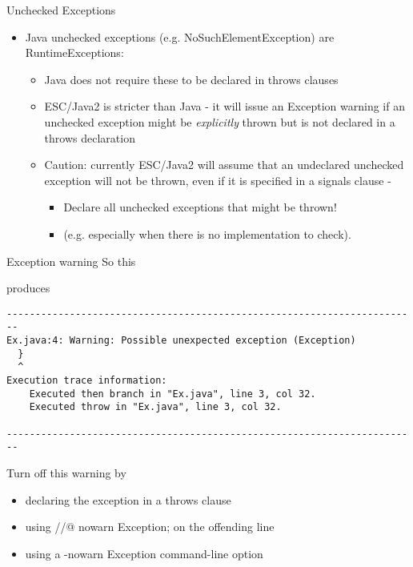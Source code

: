 \documentclass[
pdf,
nocolorBG,
slideColor,
cok,
]{prosper}
\begin{document}
\begin{slide}{Unchecked Exceptions}

\vspace*{-6ex}
\begin{itemize}
\item Java {\knalblue unchecked} exceptions (e.g. NoSuchElementException) are RuntimeExceptions:
\begin{itemize}
\item Java does not require these to be declared in throws clauses
\item ESC/Java2 is stricter than Java - it will issue an Exception warning if an unchecked exception might be \textit{explicitly} thrown but is not declared in a throws declaration 
\item Caution: currently ESC/Java2 will assume that an undeclared unchecked exception will not be thrown, even if it is specified in a signals clause - 
\begin{itemize}
\item[] Declare all unchecked exceptions that might be thrown! 
\item[] (e.g. especially when there is no implementation to check).
\end{itemize}
\end{itemize}

\end{itemize}
\end{slide}
\begin{slide}{Exception warning}
\vspace*{-12ex}
So this
\begin{figure*}
\tiny

\end{figure*}
produces
{\tiny
\begin{verbatim}
------------------------------------------------------------------------
Ex.java:4: Warning: Possible unexpected exception (Exception)
  }
  ^
Execution trace information:
    Executed then branch in "Ex.java", line 3, col 32.
    Executed throw in "Ex.java", line 3, col 32.

------------------------------------------------------------------------
\end{verbatim}
}
Turn off this warning by
\begin{itemize}
\item declaring the exception in a throws clause
\item using {\knalblue //@ nowarn Exception; } on the offending line
\item using a {\knalblue -nowarn Exception} command-line option
\end{itemize}
\end{slide}
\end{document}
